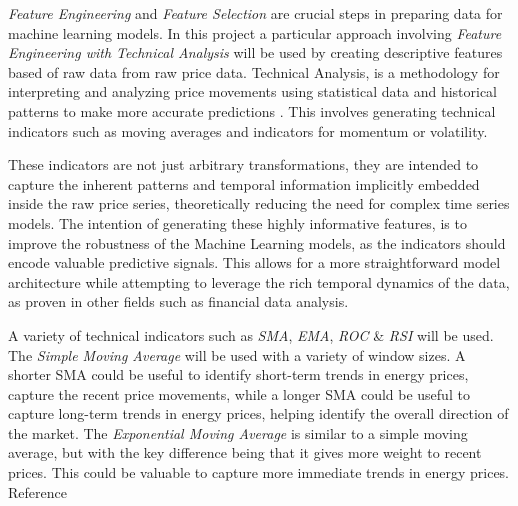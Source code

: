 \documentclass[12pt]{report} %
\begin{document}



    
        




\textit{Feature Engineering} and \textit{Feature Selection} are crucial steps in preparing data for machine learning models. In this project a particular approach involving \textit{Feature Engineering with Technical Analysis} will be used by creating descriptive features based of raw data from raw price data. Technical Analysis, is a methodology for interpreting and analyzing price movements using statistical data and historical patterns to make more accurate predictions \cite{britannica_ta}. This involves generating technical indicators such as moving averages and indicators for momentum or volatility.

These indicators are not just arbitrary transformations, they are intended to capture the inherent patterns and temporal information implicitly embedded inside the raw price series, theoretically reducing the need for complex time series models. The intention of generating these highly informative features, is to improve the robustness of the Machine Learning models, as the indicators should encode valuable predictive signals. This allows for a more straightforward model architecture while attempting to leverage the rich temporal dynamics of the data, as proven in other fields such as financial data analysis.
    
A variety of technical indicators such as \textit{SMA}, \textit{EMA}, \textit{ROC} \& \textit{RSI} will be used. The \textit{Simple Moving Average} will be used with a variety of window sizes. A shorter SMA could be useful to identify short-term trends in energy prices, capture the recent price movements, while a longer SMA could be useful to capture long-term trends in energy prices, helping identify the overall direction of the market. The \textit{Exponential Moving Average} is similar to a simple moving average, but with the key difference being that it gives more weight to recent prices. This could be valuable to capture more immediate trends in energy prices. Reference
\end{document}
